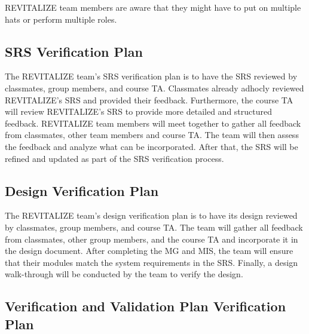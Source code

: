 \documentclass[12pt, titlepage]{article}
\begin{document}
REVITALIZE team members are aware that they might have to put on multiple hats or perform multiple roles.

\subsection{SRS Verification Plan}



The REVITALIZE team's SRS verification plan is to have the SRS reviewed by classmates, group members, and course TA. Classmates already adhocly reviewed REVITALIZE's SRS and provided their feedback. Furthermore, the course TA will review REVITALIZE's SRS to provide more detailed and structured feedback. REVITALIZE team members will meet together to gather all feedback from classmates, other team members and course TA. The team will then assess the feedback and analyze what can be incorporated. After that, the SRS will be refined and updated as part of the SRS verification process.

\subsection{Design Verification Plan}




The REVITALIZE team's design verification plan is to have its design reviewed by classmates, group members, and course TA. The team will gather all feedback from classmates, other group members, and the course TA and incorporate it in the design document. After completing the MG and MIS, the team will ensure that their modules match the system requirements in the SRS. Finally, a design walk-through will be conducted by the team to verify the design.

\subsection{Verification and Validation Plan Verification Plan}

\end{document}
